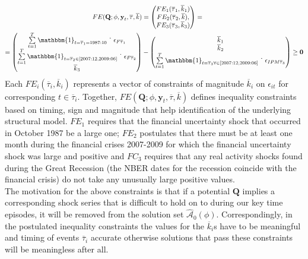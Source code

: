 \documentclass[a4paper,11pt,listof=nochaptergap,oneside,pointednumbers,bibtotoc,bigheadings,liststotoc]{scrbook}
\theoremstyle{mysatz}
\theoremstyle{mydefinition}
\theoremstyle{mybemerkung}
\let\oldhat\hat
\newcommand{\vect}[1]{\boldsymbol{\mathbf{#1}}}
\newcommand{\hatt}[1]{\oldhat{\boldsymbol{\mathbf{#1}}}}
\begin{document}
\begin{equation} \label{eq:svar_ludvi12}
\begin{split}
	FE(\vect{Q}; \phi, \vect{y}_t, \overline{\tau}, \overline{k}) & = \begin{pmatrix}
	FE_1(\overline{\tau}_1, \overline{k}_1)\\
	 FE_2(\overline{\tau}_2, \overline{k}), \\
	 FE_3(\overline{\tau}_3, \overline{k}_3)
	\end{pmatrix} = \\
	= \begin{pmatrix}
	\sum\limits_{t=1}^T \mathbbm{1}_{t = \overline{\tau}_1= 1987:10} \dot \quad \epsilon_{F\overline{\tau}_1}  \\
	 \sum\limits_{t=1}^T \mathbbm{1}_{t = \overline{\tau}_2 \in [2007:12, 2009:06]} \dot \quad \epsilon_{F\overline{\tau}_2}  \\
	\overline{k}_3
	\end{pmatrix} & - 
	\begin{pmatrix}
	\overline{k}_1\\
	\overline{k}_2  \\
	\sum\limits_{t=1}^T \mathbbm{1}_{t = \overline{\tau}_3 \forall \in [2007:12, 2009:06]} \dot \quad \epsilon_{IPM\overline{\tau}_3} 
	\end{pmatrix} \geq \vect{0}
\end{split}								
\end{equation}
Each $FE_i(\overline{\tau}_i, \overline{k}_i)$ represents a vector of constraints of magnitude $\overline{k}_i$ on $\epsilon_{it}$ for corresponding $t \in \overline{\tau}_i$. Together, $FE(\vect{Q}; \phi, \vect{y}_t, \overline{\tau}, \overline{k})$ defines inequality constraints based on timing, sign and magnitude that help identification of the underlying structural model. $FE_1$ requires that the financial uncertainty shock that occurred in October 1987 be a large one; $FE_2$ postulates that there must be at least one month during the financial crises 2007-2009 for which the financial uncertainty shock was large and positive and $FC_3$ requires that any real activity shocks found during the Great Recession (the NBER dates for the recession coincide with the financial crisis) do not take any unusually large positive values.\\
The motivation for the above constraints is that if a potential $\vect{Q}$ implies a corresponding shock series that is difficult to hold on to during our key time episodes, it will be removed from the solution set $\hatt{\mathcal{A}}_0(\phi)$. Correspondingly, in the postulated inequality constraints the values for the $\overline{k}_i$s have to be meaningful and timing of events $\overline{\tau}_i$ accurate otherwise solutions that pass these constraints will be meaningless after all.
\end{document}
